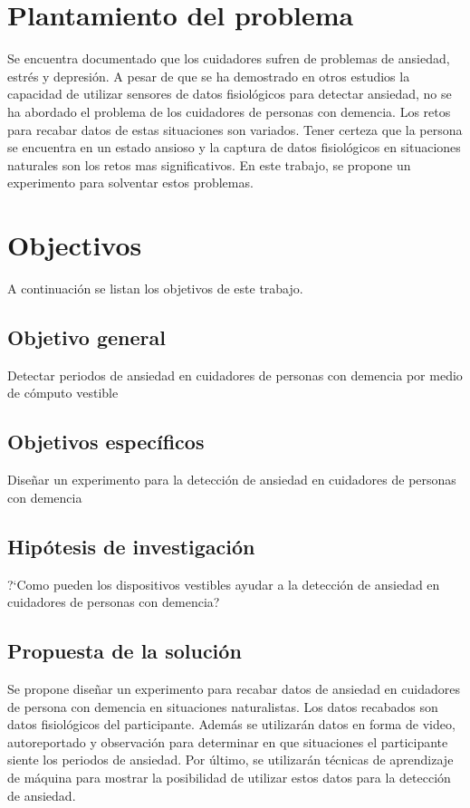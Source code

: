 \section{Plantamiento del problema}
	Se encuentra documentado que los cuidadores sufren de problemas de ansiedad, estr\'es y depresi\'on. A pesar de que se ha demostrado en otros estudios la capacidad de utilizar sensores de datos fisiol\'ogicos para detectar ansiedad, no se ha abordado el problema de los cuidadores de personas con demencia. Los retos para recabar datos de estas situaciones son variados. Tener certeza que la persona se encuentra en un estado ansioso y la captura de datos fisiol\'ogicos en situaciones naturales son los retos mas significativos. En este trabajo, se propone un experimento para solventar estos problemas.
\section{Objectivos}
	A continuaci\'on se listan los objetivos de este trabajo.
\subsection{Objetivo general}
	Detectar periodos de ansiedad en cuidadores de personas con demencia por medio de c\'omputo vestible
\subsection{Objetivos espec\'ificos}
	Dise\~nar un experimento para la detecci\'on de ansiedad en cuidadores de personas con demencia
\subsection{Hip\'otesis de investigaci\'on}
	?`Como pueden los dispositivos vestibles ayudar a la detecci\'on de ansiedad en cuidadores de personas con demencia?
\subsection{Propuesta de la soluci\'on}
	Se propone dise\~nar un experimento para recabar datos de ansiedad en cuidadores de persona con demencia en situaciones naturalistas. Los datos recabados son datos fisiol\'ogicos del participante. Adem\'as se utilizar\'an datos en forma de video, autoreportado y observaci\'on para determinar en que situaciones el participante siente los periodos de ansiedad. Por \'ultimo, se utilizar\'an t\'ecnicas de aprendizaje de m\'aquina para mostrar la posibilidad de utilizar estos datos para la detecci\'on de ansiedad.

